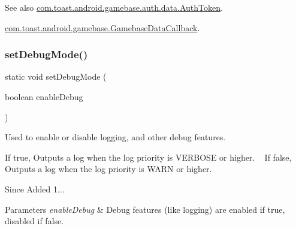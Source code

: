 \begin{DoxySeeAlso}{See also}
\hyperlink{classcom_1_1toast_1_1android_1_1gamebase_1_1auth_1_1data_1_1_auth_token}{com.\+toast.\+android.\+gamebase.\+auth.\+data.\+Auth\+Token}. 

\hyperlink{interfacecom_1_1toast_1_1android_1_1gamebase_1_1_gamebase_data_callback}{com.\+toast.\+android.\+gamebase.\+Gamebase\+Data\+Callback}. 
\end{DoxySeeAlso}
\mbox{\label{classcom_1_1toast_1_1android_1_1gamebase_1_1_gamebase_a4370928bb241d35d896feb65e206a7d4}} 
\subsubsection{\texorpdfstring{set\+Debug\+Mode()}{setDebugMode()}}
{\footnotesize\ttfamily static void set\+Debug\+Mode (\begin{DoxyParamCaption}\item[{boolean}]{enable\+Debug }\end{DoxyParamCaption})\hspace{0.3cm}{\ttfamily [static]}}



Used to enable or disable logging, and other debug features. 

If true, Outputs a log when the log priority is V\+E\+R\+B\+O\+SE or higher. ~\newline
 If false, Outputs a log when the log priority is W\+A\+RN or higher.

\begin{DoxySince}{Since}
Added 1... 
\end{DoxySince}

\begin{DoxyParams}{Parameters}
{\em enable\+Debug} & Debug features (like logging) are enabled if true, disabled if false. \\
\hline
\end{DoxyParams}
\mbox{\label{classcom_1_1toast_1_1android_1_1gamebase_1_1_gamebase_a5a885b93b5dd0a1fa805ee9585da33b6}} 
